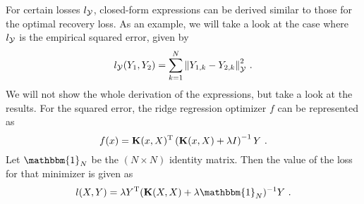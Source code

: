 For certain losses $l_{\mathcal{Y}}$, closed-form expressions can be derived similar to those for the optimal recovery loss.
As an example, we will take a look at the case where $l_{\mathcal{Y}}$ is the empirical squared error, given by
\begin{equation}
	l_{\mathcal{Y}}(Y_1, Y_2) = \sum_{k=1}^{N} \norm{Y_{1, k} - Y_{2, k}}_{\mathcal{Y}}^2 \ .
\end{equation}
We will not show the whole derivation of the expressions, but take a look at the results.
For the squared error, the ridge regression optimizer $f$ can be represented as
\begin{equation}
	\label{eq:ridge-regression-f}
	f(x) = \mathbf{K}(x, X)^{\mathrm{T}} \left(\mathbf{K}(x, X) + \lambda I\right)^{-1}Y \ .
\end{equation}
Let $\mathbbm{1}_N$ be the $(N\times N)$ identity matrix.
Then the value of the loss for that minimizer is given as
\begin{equation}
	\label{eq:ridge-regression-loss-se-closed-form}
	l(X, Y) = \lambda Y^\T (\mathbf{K}(X, X) + \lambda \mathbbm{1}_N)^{-1} Y \ .
\end{equation}
